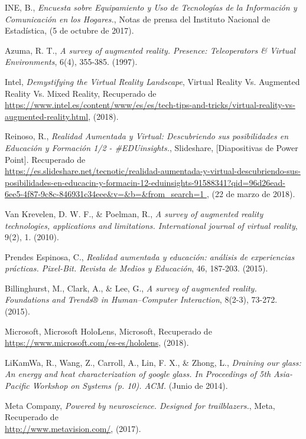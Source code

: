 
INE, B., {\em Encuesta sobre Equipamiento y Uso de Tecnologías de la Información y Comunicación en los Hogares.}, Notas de prensa del Instituto Nacional de Estadística, (5 de octubre de 2017).

Azuma, R. T., {\em A survey of augmented reality. Presence: Teleoperators & Virtual Environments}, 6(4), 355-385. (1997).

Intel, {\em Demystifying the Virtual Reality Landscape}, Virtual Reality Vs. Augmented Reality Vs. Mixed Reality, Recuperado de \\
\url{https://www.intel.es/content/www/es/es/tech-tips-and-tricks/virtual-reality-vs-augmented-reality.html}, (2018).

Reinoso, R., {\em Realidad Aumentada y Virtual: Descubriendo sus posibilidades en Educación y Formación 1/2 - #EDUinsights.}, Slideshare, [Diapositivas de Power Point]. Recuperado de \\
\url{https://es.slideshare.net/tecnotic/realidad-aumentada-y-virtual-descubriendo-sus-posibilidades-en-educacin-y-formacin-12-eduinsights-91588341?qid=96d26ead-6ee5-4f87-9c8c-846931c34eee&v=&b=&from_search=1  }, (22 de marzo de 2018).

Van Krevelen, D. W. F., & Poelman, R., {\em A survey of augmented reality technologies, applications and limitations. International journal of virtual reality},  9(2), 1. (2010).

Prendes Espinosa, C., {\em Realidad aumentada y educación: análisis de experiencias prácticas. Pixel-Bit. Revista de Medios y Educación}, 46, 187-203. (2015).

Billinghurst, M., Clark, A., & Lee, G., {\em A survey of augmented reality. Foundations and Trends® in Human–Computer Interaction}, 8(2-3), 73-272. (2015).

Microsoft, Microsoft HoloLens, Microsoft, Recuperado de \\
\url{https://www.microsoft.com/es-es/hololens}, (2018).

LiKamWa, R., Wang, Z., Carroll, A., Lin, F. X., & Zhong, L., {\em Draining our glass: An energy and heat characterization of google glass. In Proceedings of 5th Asia-Pacific Workshop on Systems (p. 10). ACM.} (Junio de 2014).

Meta Company, {\em Powered by neuroscience. Designed for trailblazers.}, Meta, Recuperado de \\
\url{http://www.metavision.com/}, (2017).

